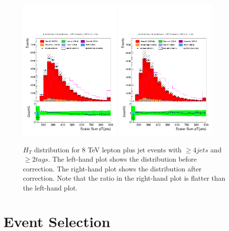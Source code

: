 \begin{figure}[hbtp]
 \begin{center}
   \includegraphics[width=0.45\textwidth]{Figures/Analysis_1_Diagrams/d2MCPlots_Ht_cut0_4JIncl_2TIncl_Combined.pdf}
   \includegraphics[width=0.45\textwidth]{Figures/Analysis_1_Diagrams/d2MCPlots_Ht_cut0_4JIncl_2TIncl_Combined_HtWgt.pdf}
   \caption{$H_{T}$ distribution for 8 TeV lepton plus jet events with
   $\geq 4 jets$ and $\geq 2 tags$. The left-hand plot shows the
   distribution before correction. The right-hand plot shows the
   distribution after correction. Note that the ratio in the right-hand
   plot is flatter than the left-hand plot.}
   \label{fig:HTBeforeAfter}
   \end{center}
\end{figure}




\section{Event Selection}
\label{event_selection_overview}

